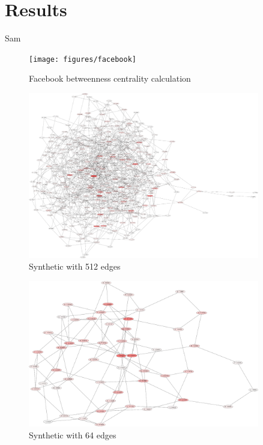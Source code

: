 \documentclass[11pt,a4paper,titlepage]{article}
\begin{document}
\section{Results} %
\label{sec:results}

Sam

\begin{figure}[h]
\centering
\texttt{[image: figures/facebook]}
\caption{Facebook betweenness centrality calculation}
\end{figure}

\begin{figure}[h]
\centering
\includegraphics[width=0.9\textwidth]{figures/synthetic512_1}
\caption{Synthetic with 512 edges}
\end{figure}

\begin{figure}[h]
\centering
\includegraphics[width=0.9\textwidth]{figures/synthetic64_2}
\caption{Synthetic with 64 edges}
\end{figure}
\end{document}

